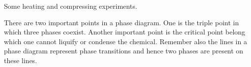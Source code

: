 \documentclass[main.tex]{subfiles}
\begin{document}
\begin{description}
\begin{marginfigure}[-2cm]
%
\caption{Some heating and compressing experiments.}

\end{marginfigure}%


\item[\docfilehook{Important points in a phase diagram}{}] There are two important points in a phase diagram. One is the triple point in which three phases coexist. Another important point is the critical point belong which one cannot liquify or condense the chemical. Remember also the lines in a phase diagram represent phase transitions and hence two phases are present on these lines.



\end{description}



%
\end{document}
